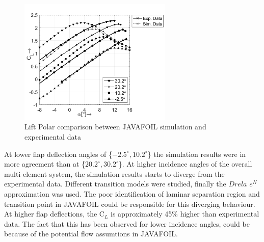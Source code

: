\documentclass[main.tex]{subfiles}
\begin{document}
\begin{figure}[h!]
\centering
\hspace{1.8cm}\includegraphics[width=0.65\textwidth]{./Images/Ass4/Cl_Comparison}
\caption{Lift Polar comparison between JAVAFOIL simulation and experimental data}
\label{fig5}
\end{figure}
At lower flap deflection angles of \{$-2.5^{\circ},10.2^{\circ}$\} the simulation results were in more agreement than at  \{$20.2^{\circ},30.2^{\circ}$\}. At higher incidence angles of the overall multi-element system, the simulation results starts to diverge from the experimental data. Different transition models were studied, finally the $Drela$ $e^N$ approximation was used. The poor identification of laminar separation region and transition point in JAVAFOIL could be responsible for this diverging behaviour. At higher flap deflections, the C$_L$ is approximately 45\% higher than experimental data. The fact that this has been observed for lower incidence angles, could be because of the potential flow assumtions in JAVAFOIL.\\ 
\end{document}
